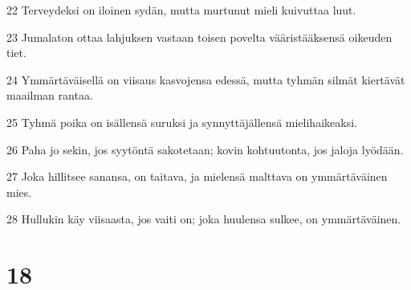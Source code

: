 \par 22 Terveydeksi on iloinen sydän, mutta murtunut mieli kuivuttaa luut.
\par 23 Jumalaton ottaa lahjuksen vastaan toisen povelta vääristääksensä oikeuden tiet.
\par 24 Ymmärtäväisellä on viisaus kasvojensa edessä, mutta tyhmän silmät kiertävät maailman rantaa.
\par 25 Tyhmä poika on isällensä suruksi ja synnyttäjällensä mielihaikeaksi.
\par 26 Paha jo sekin, jos syytöntä sakotetaan; kovin kohtuutonta, jos jaloja lyödään.
\par 27 Joka hillitsee sanansa, on taitava, ja mielensä malttava on ymmärtäväinen mies.
\par 28 Hullukin käy viisaasta, jos vaiti on; joka huulensa sulkee, on ymmärtäväinen.

\chapter{18}

